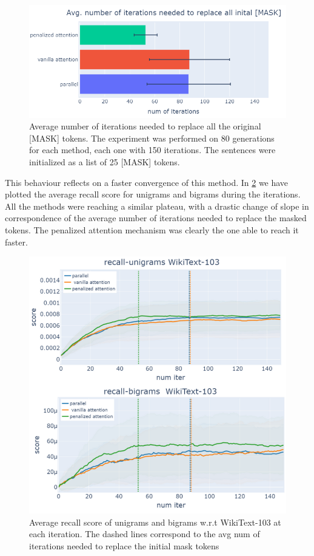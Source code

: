 \documentclass[10pt,twocolumn,letterpaper]{article}
\begin{document}
\begin{figure}[t!]
   \centering
   \includegraphics[width =\linewidth]{newplot (21).png}
   \caption{Average number of iterations needed to replace all the original [MASK] tokens.
   The experiment was performed on 80 generations for each method, each one with 150 iterations.
   The sentences were initialized as a list of 25 [MASK] tokens.}
   \label{fig:ReplaceMask}
\end{figure}

This behaviour reflects on a faster convergence of this method.
In \ref{fig:Recall} we have plotted the average recall score for unigrams and bigrams during the iterations.
All the methods were reaching a similar plateau, with a drastic change of slope in correspondence of the
average number of iterations needed to replace the masked tokens. The penalized attention mechanism was clearly the
one able to reach it faster.

\begin{figure}[t!]
   \centering
   \includegraphics[width=\linewidth]{recall.png}
   \caption{Average recall score of unigrams and bigrams w.r.t WikiText-103
   at each iteration. The dashed lines correspond to the avg num of iterations needed
   to replace the initial mask tokens}
   \label{fig:Recall}
\end{figure}
\end{document}
